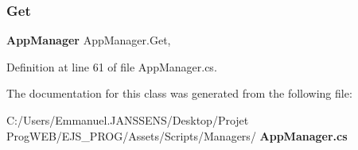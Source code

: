 \subsubsection{Get}
{\footnotesize\ttfamily \textbf{ App\+Manager} App\+Manager.\+Get\hspace{0.3cm}{\ttfamily [static]}, {\ttfamily [get]}}



Definition at line 61 of file App\+Manager.\+cs.



The documentation for this class was generated from the following file\+:\begin{DoxyCompactItemize}
\item 
C\+:/\+Users/\+Emmanuel.\+J\+A\+N\+S\+S\+E\+N\+S/\+Desktop/\+Projet Prog\+W\+E\+B/\+E\+J\+S\+\_\+\+P\+R\+O\+G/\+Assets/\+Scripts/\+Managers/\textbf{ App\+Manager.\+cs}\end{DoxyCompactItemize}
